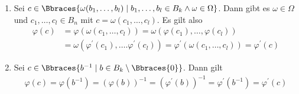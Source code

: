 \begin{solution}
\begin{enumerate}[label = (\roman*)]
\begin{enumerate}[label = Fall \arabic*:]
            \item Sei $c \in \Bbraces{\omega(b_1, \dots, b_l) \mid b_1, \dots, b_l \in B_k \land \omega \in \Omega}$. Dann gibt es $\omega \in \Omega$ und $c_1, \dots, c_l \in B_n$ mit $c = \omega(c_1, \dots, c_l)$. Es gilt also
            \begin{align*}
                \varphi(c) &= \varphi(\omega(c_1, \dots, c_l)) = \omega(\varphi(c_1), \dots, \varphi(c_l)) \\
                &= \omega(\varphi^\prime(c_1), \dots. \varphi^\prime(c_l)) = \varphi^\prime(\omega(c_1, \dots, c_l)) = \varphi^\prime(c)
            \end{align*}
            \item Sei $c \in \Bbraces{b^{-1} \mid b \in B_k \setminus \Bbraces{0}}$. Dann gilt 
            \begin{align*}
                \varphi(c) = \varphi(b^{-1}) = (\varphi(b))^{-1} = (\varphi^\prime(b))^{-1} = \varphi^\prime(b^{-1}) = \varphi^\prime(c) 
            \end{align*}
        \end{enumerate}
    \end{enumerate}
\end{solution}
